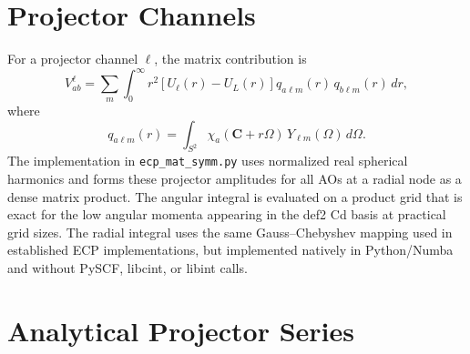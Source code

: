 \documentclass[11pt]{article}
\begin{document}
\section{Projector Channels}

For a projector channel \(\ell\), the matrix contribution is
\begin{equation}
  V^{\ell}_{ab}
  =
  \sum_m \int_0^\infty r^2
  \left[U_\ell(r)-U_L(r)\right]
  q_{a\ell m}(r)\,q_{b\ell m}(r)\,dr ,
\end{equation}
where
\begin{equation}
  q_{a\ell m}(r)
  =
  \int_{S^2}
  \chi_a(\mathbf C+r\Omega)\,Y_{\ell m}(\Omega)\,d\Omega .
\end{equation}
The implementation in \texttt{ecp\_mat\_symm.py} uses normalized real spherical harmonics and forms these
projector amplitudes for all AOs at a radial node as a dense matrix product.
The angular integral is evaluated on a product grid that is exact for the low
angular momenta appearing in the def2 Cd basis at practical grid sizes. The
radial integral uses the same Gauss--Chebyshev mapping used in established ECP
implementations, but implemented natively in Python/Numba and without PySCF,
libcint, or libint calls.

\section{Analytical Projector Series}
\end{document}
